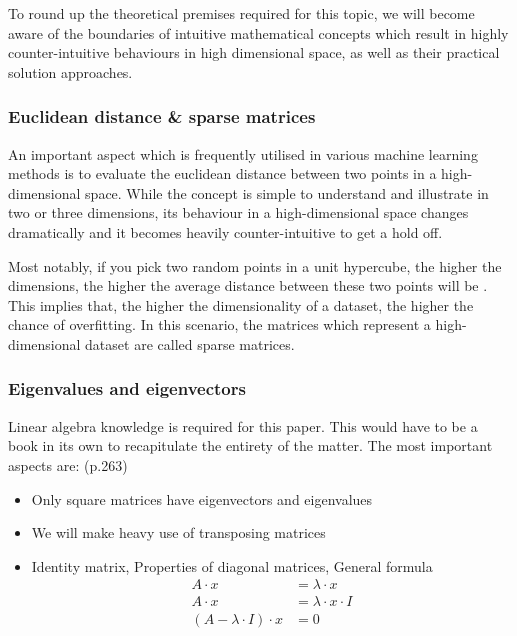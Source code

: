 
To round up the theoretical premises required for this topic, we will become aware of the boundaries of intuitive mathematical concepts which result in highly counter-intuitive behaviours in high dimensional space, as well as their practical solution approaches.

\subsubsection{Euclidean distance \& sparse matrices}

An important aspect which is frequently utilised in various machine learning methods is to evaluate the euclidean distance between two points in a high-dimensional space.
While the concept is simple to understand and illustrate in two or three dimensions, its behaviour in a high-dimensional space changes dramatically and it becomes heavily counter-intuitive to get a hold off.

Most notably, if you pick two random points in a unit hypercube, the higher the dimensions, the higher the average distance between these two points will be \cite{HandsOnMLCh8}.
This implies that, the higher the dimensionality of a dataset, the higher the chance of overfitting.
In this scenario, the matrices which represent a high-dimensional dataset are called sparse matrices.

\vspace{2mm}



\subsubsection{Eigenvalues and eigenvectors}

Linear algebra knowledge is required for this paper.
This would have to be a book in its own to recapitulate the entirety of the matter.
The most important aspects are: \cite{Strang2005tn} (p.263)

\begin{itemize}
	\item Only square matrices have eigenvectors and eigenvalues
	\item We will make heavy use of transposing matrices
	\item Identity matrix, Properties of diagonal matrices, General formula
	\begin{align}
		\label{formula:one}
		A \cdot x &= \lambda \cdot x 
		\\
		\label{formula:two}
		A \cdot x &= \lambda \cdot x \cdot I
		\\
		\label{formula:three}
		(A - \lambda \cdot I)\cdot x &= 0
	\end{align}
\end{itemize}



